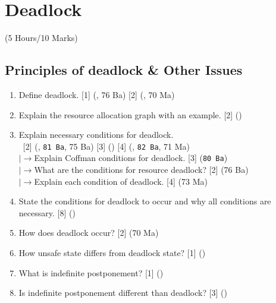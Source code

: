\documentclass[12pt]{article}
\newcommand{\lb}{\\$\left|\rightarrow\right.$}
\newcommand{\enter}{\\\textcolor{white}{1}}
\begin{document}
\pagebreak
\section{Deadlock}
	\begin{center}(5 Hours/10 Marks)\end{center}
	\subsection{Principles of deadlock \& Other Issues}
		\begin{enumerate}[noitemsep, topsep=0pt]
			\item Define deadlock. \hfill [1] (, 76 Ba) [2] (, 70 Ma)
			
			\item Explain the resource allocation graph with an example. \hfill [2] ()

			\item Explain necessary conditions for deadlock.
			\enter\hfill [2] {\footnotesize (, \texttt{81 Ba}, 75 Ba)} [3] {\footnotesize ()} [4] {\footnotesize (, \texttt{82 Ba}, 71 Ma)}
			\lb Explain Coffman conditions for deadlock. \hfill [3] (\texttt{80 Ba})
			\lb What are the conditions for resource deadlock? \hfill [2] (76 Ba)
			\lb Explain each condition of deadlock. \hfill [4] (73 Ma)

			\item State the conditions for deadlock to occur and why all conditions are necessary. \hfill [8] ()

			\item How does deadlock occur? \hfill [2] (70 Ma)

			\item How unsafe state differs from deadlock state? \hfill [1] ()

			\item What is indefinite postponement? \hfill [1] ()
			
			\item Is indefinite postponement different than deadlock? \hfill [3] ()
		\end{enumerate}
\end{document}

